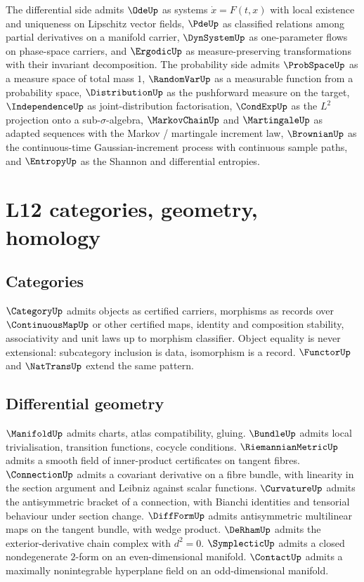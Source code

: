 The differential side admits $\OdeUp$ as systems $\dot x = F(t,x)$ with local existence and uniqueness on Lipschitz vector fields, $\PdeUp$ as classified relations among partial derivatives on a manifold carrier, $\DynSystemUp$ as one-parameter flows on phase-space carriers, and $\ErgodicUp$ as measure-preserving transformations with their invariant decomposition. The probability side admits $\ProbSpaceUp$ as a measure space of total mass $1$, $\RandomVarUp$ as a measurable function from a probability space, $\DistributionUp$ as the pushforward measure on the target, $\IndependenceUp$ as joint-distribution factorisation, $\CondExpUp$ as the $L^2$ projection onto a sub-$\sigma$-algebra, $\MarkovChainUp$ and $\MartingaleUp$ as adapted sequences with the Markov / martingale increment law, $\BrownianUp$ as the continuous-time Gaussian-increment process with continuous sample paths, and $\EntropyUp$ as the Shannon and differential entropies.

\section{L12 categories, geometry, homology}
\label{sec:roadmap-l12-categories-geometry-homology}

\subsection*{Categories}

$\CategoryUp$ admits objects as certified carriers, morphisms as records over $\ContinuousMapUp$ or other certified maps, identity and composition stability, associativity and unit laws up to morphism classifier. Object equality is never extensional: subcategory inclusion is data, isomorphism is a record. $\FunctorUp$ and $\NatTransUp$ extend the same pattern.

\subsection*{Differential geometry}

$\ManifoldUp$ admits charts, atlas compatibility, gluing. $\BundleUp$ admits local trivialisation, transition functions, cocycle conditions. $\RiemannianMetricUp$ admits a smooth field of inner-product certificates on tangent fibres. $\ConnectionUp$ admits a covariant derivative on a fibre bundle, with linearity in the section argument and Leibniz against scalar functions. $\CurvatureUp$ admits the antisymmetric bracket of a connection, with Bianchi identities and tensorial behaviour under section change. $\DiffFormUp$ admits antisymmetric multilinear maps on the tangent bundle, with wedge product. $\DeRhamUp$ admits the exterior-derivative chain complex with $d^2 = 0$. $\SymplecticUp$ admits a closed nondegenerate $2$-form on an even-dimensional manifold. $\ContactUp$ admits a maximally nonintegrable hyperplane field on an odd-dimensional manifold.

